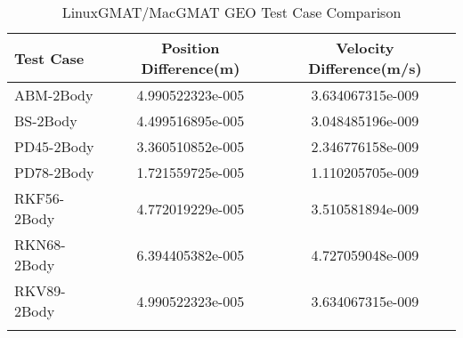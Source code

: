 \begin{table}[htbp!]
\centering
\caption{ LinuxGMAT/MacGMAT GEO Test Case Comparison}
      \begin{tabular}{lcc}
      \hline\hline
          Test Case & Position Difference(m) & Velocity Difference(m/s) \\
         \hline
         ABM-2Body & 4.990522323e-005 & 3.634067315e-009 \\
         BS-2Body & 4.499516895e-005 & 3.048485196e-009 \\
         PD45-2Body & 3.360510852e-005 & 2.346776158e-009 \\
         PD78-2Body & 1.721559725e-005 & 1.110205705e-009 \\
         RKF56-2Body & 4.772019229e-005 & 3.510581894e-009 \\
         RKN68-2Body & 6.394405382e-005 & 4.727059048e-009 \\
         RKV89-2Body & 4.990522323e-005 & 3.634067315e-009 \\
      \hline\hline
      \label{Table: GEO LinuxGMAT-MacGMAT Table} 
\end{tabular}
\end{table}

